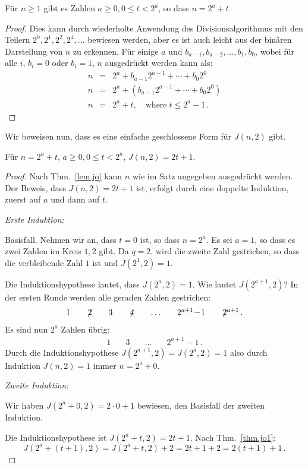 \begin{theorem}\label{lem.jo}
Für $n\geq 1$ gibt es Zahlen $a\geq 0, 0\leq t < 2^a$, so dass $n=2^a+t$.
\end{theorem}
\begin{proof}
Dies kann durch wiederholte Anwendung des Divisionsalgorithmus mit den Teilern $2^0, 2^1, 2^2, 2^4,\ldots$ bewiesen werden, aber es ist auch leicht aus der binären Darstellung von $n$ zu erkennen. Für einige $a$ und $b_{a-1},b_{a-2},\ldots,b_{1},b_{0}$, wobei für alle $i$, $b_i=0$ oder $b_i=1$, $n$ ausgedrückt werden kann als:
\begin{eqnarray*}
n&=&2^a+b_{a-1}2^{a-1}+\cdots+b_{0}2^{0}\\
n&=&2^a+(b_{a-1}2^{a-1}+\cdots+b_{0}2^{0})\\
n&=&2^a+t,\quad \textrm{where}\; t\leq 2^a-1\,.
\end{eqnarray*}
\end{proof}
Wir beweisen nun, dass es eine einfache geschlossene Form für $J(n,2)$ gibt. 
\begin{theorem}\label{thm.jo2}
Für $n=2^a+t$, $a\geq 0, 0\leq t < 2^a$, $J(n,2)=2t+1$.
\end{theorem}

\begin{proof}
Nach Thm.~\ref{lem.jo} kann $n$ wie im Satz angegeben ausgedrückt werden. Der Beweis, dass $J(n,2)=2t+1$ ist, erfolgt durch eine doppelte Induktion, zuerst auf $a$ und dann auf $t$.

\textit{Erste Induktion:}

Basisfall. Nehmen wir an, dass $t=0$ ist, so dass $n=2^a$. Es sei $a=1$, so dass es zwei Zahlen im Kreis $1,2$ gibt. Da $q=2$, wird die zweite Zahl gestrichen, so dass die verbleibende Zahl $1$ ist und $J(2^1,2)=1$.

Die Induktionshypothese lautet, dass $J(2^a,2)=1$. Wie lautet $J(2^{a+1},2)$? In der ersten Runde werden alle geraden Zahlen gestrichen:
\[
\begin{array}{rrrrrrrrrrrrrrrrrrrrrrrrrrrr}
1&\quad\not\! 2&\quad3&\quad\not\! 4& \quad\ldots&\quad 2^{a+1}\!-\!1&\quad \not\! 2^{a+1}\,.
\end{array}
\]
Es sind nun $2^a$ Zahlen übrig:
\[
\begin{array}{rrrrrrrrrrrrrrrrrrrrrrrrrrrr}
1&\quad3&\quad\ldots&\quad 2^{a+1}\!-\!1\,.
\end{array}
\]
Durch die Induktionshypothese $J(2^{a+1},2)=J(2^a,2)=1$ also durch Induktion $J(n,2)=1$ immer $n=2^a+0$.

\textit{Zweite Induktion:}

Wir haben $J(2^a+0,2)=2\cdot 0 +1$ bewiesen, den Basisfall der zweiten Induktion.

Die Induktionshypothese ist $J(2^a+t,2)=2t+1$. Nach Thm.~\ref{thm.jo1}:
\[
J(2^a+(t+1),2)=J(2^a+t,2)+2=2t+1+2=2(t+1)+1\,.
\]
\end{proof}

